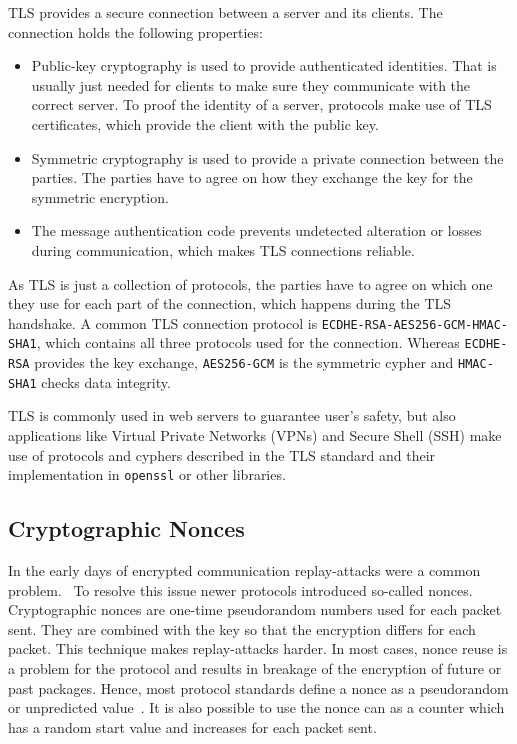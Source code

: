 TLS provides a secure connection between a server and its clients. The
connection holds the following properties:
\begin{itemize}
  \item Public-key cryptography is used to provide authenticated identities.
  That is usually just needed for clients to make sure they communicate with the
  correct server. To proof the identity of a server, protocols make use of TLS
  certificates, which provide the client with the public key.
  \item Symmetric cryptography is used to provide a private connection between
  the parties. The parties have to agree on how they exchange the key for the
  symmetric encryption.
  \item The message authentication code prevents undetected alteration
  or losses during communication, which makes TLS connections reliable.
\end{itemize}

As TLS is just a collection of protocols, the parties have to agree on which one
they use for each part of the connection, which happens during the TLS
handshake. A common TLS connection protocol is
\texttt{ECDHE-RSA-AES256-GCM-HMAC-SHA1}, which contains all three protocols used
for the connection. Whereas \texttt{ECDHE-RSA} provides the key exchange,
\texttt{AES256-GCM} is the  symmetric cypher and \texttt{HMAC-SHA1} checks data
integrity.

TLS is commonly used in web servers to guarantee user's safety, but also
applications like Virtual Private Networks (VPNs) and Secure Shell (SSH) make
use of protocols and cyphers described in the TLS standard and their
implementation in \texttt{openssl} or other libraries.


\subsection{Cryptographic Nonces}

In the early days of encrypted communication replay-attacks were a common
problem.~ To resolve this issue newer
protocols introduced so-called nonces. Cryptographic nonces are one-time
pseudorandom numbers used for each packet sent. They are combined with the key
so that the encryption differs for each packet. This technique makes
replay-attacks harder. In most cases, nonce reuse is a problem for the protocol
and results in breakage of the encryption of future or past packages. Hence,
most protocol standards define a nonce as a pseudorandom or unpredicted
value~\cite{noncegeneral}. It is also possible to use the nonce can as a counter
which has a random start value and increases for each packet sent.

